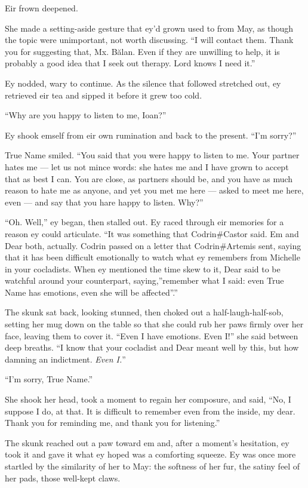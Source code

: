 Eir frown deepened.

She made a setting-aside gesture that ey'd grown used to from May, as though the topic were unimportant, not worth discussing. ``I will contact them. Thank you for suggesting that, Mx. Bălan. Even if they are unwilling to help, it is probably a good idea that I seek out therapy. Lord knows I need it.''

Ey nodded, wary to continue. As the silence that followed stretched out, ey retrieved eir tea and sipped it before it grew too cold.

``Why are you happy to listen to me, Ioan?''

Ey shook emself from eir own rumination and back to the present. ``I'm sorry?''

True Name smiled. ``You said that you were happy to listen to me. Your partner hates me — let us not mince words: she hates me and I have grown to accept that as best I can. You are close, as partners should be, and you have as much reason to hate me as anyone, and yet you met me here — asked to meet me here, even — and say that you hare happy to listen. Why?''

``Oh. Well,'' ey began, then stalled out. Ey raced through eir memories for a reason ey could articulate. ``It was something that Codrin\#Castor said. Em and Dear both, actually. Codrin passed on a letter that Codrin\#Artemis sent, saying that it has been difficult emotionally to watch what ey remembers from Michelle in your cocladists. When ey mentioned the time skew to it, Dear said to be watchful around your counterpart, saying,''remember what I said: even True Name has emotions, even she will be affected''.''

The skunk sat back, looking stunned, then choked out a half-laugh-half-sob, setting her mug down on the table so that she could rub her paws firmly over her face, leaving them to cover it. ``Even I have emotions. Even I!'' she said between deep breaths. ``I know that your cocladist and Dear meant well by this, but how damning an indictment. \emph{Even I.}''

``I'm sorry, True Name.''

She shook her head, took a moment to regain her composure, and said, ``No, I suppose I do, at that. It is difficult to remember even from the inside, my dear. Thank you for reminding me, and thank you for listening.''

The skunk reached out a paw toward em and, after a moment's hesitation, ey took it and gave it what ey hoped was a comforting squeeze. Ey was once more startled by the similarity of her to May: the softness of her fur, the satiny feel of her pads, those well-kept claws.

